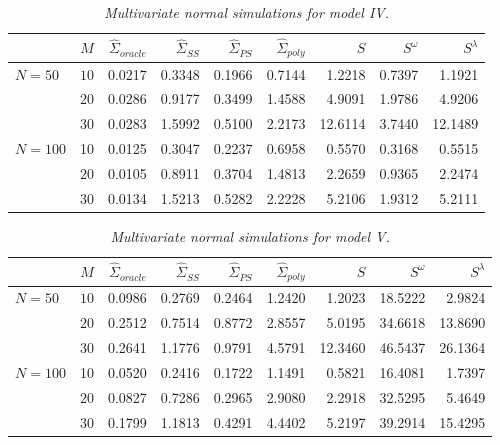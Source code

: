 %
\begin{table}[H]
\centering
\caption{\textit{Multivariate normal simulations for model IV.}}
\begin{tabular}{lrrrrrrrr}
 & $M$ & $\hat{\Sigma}_{oracle}$ & $\hat{\Sigma}_{SS}$& $\hat{\Sigma}_{PS}$ & $\hat{\Sigma}_{poly}$ & $S$ &$S^\omega$& $S^\lambda$ \\ 
  \hline
 $N = 50$ & $10$ & 0.0217 & 0.3348 & 0.1966 & 0.7144 & 1.2218 & 0.7397 & 1.1921 \\ 
   & $20$ &0.0286 & 0.9177 & 0.3499 &  1.4588 & 4.9091 & 1.9786 & 4.9206 \\ 
       & $30$ &  0.0283 &1.5992 & 0.5100 & 2.2173 & 12.6114 & 3.7440 & 12.1489 \\ 
     $N = 100$ & 10 & 0.0125 & 0.3047 & 0.2237 &  0.6958 & 0.5570 & 0.3168 & 0.5515 \\ 
       & $20$ &0.0105 & 0.8911 & 0.3704 &  1.4813 & 2.2659 & 0.9365 & 2.2474 \\ 
       & $30$ & 0.0134 & 1.5213 & 0.5282 & 2.2228 & 5.2106 & 1.9312 & 5.2111 \\ 
   \hline
\end{tabular} 
\label{table:simulation-1-entropy-loss-sigma-4}
\end{table}

%
\begin{table}[H]
\centering
\caption{\textit{Multivariate normal simulations for model V.}}
\begin{tabular}{lrrrrrrrr}
 & $M$ &$\hat{\Sigma}_{oracle}$&$\hat{\Sigma}_{SS}$& $\hat{\Sigma}_{PS}$ & $\hat{\Sigma}_{poly}$ & $S$ &$S^\omega$& $S^\lambda$ \\ 
  \hline
 $N = 50$ & $10$ &  0.0986 &0.2769 & 0.2464 & 1.2420 & 1.2023 & 18.5222 & 2.9824 \\ 
  & $20$ &0.2512 & 0.7514 & 0.8772 &  2.8557 & 5.0195 & 34.6618 & 13.8690 \\ 
  & $30$ &  0.2641& 1.1776 & 0.9791  & 4.5791 & 12.3460 & 46.5437 & 26.1364 \\ 
 $N = 100$ & 10 &0.0520 & 0.2416 & 0.1722 &  1.1491 & 0.5821 & 16.4081 & 1.7397 \\ 
  & $20$ & 0.0827 & 0.7286 & 0.2965 &  2.9080 & 2.2918 & 32.5295 & 5.4649 \\ 
   & $30$ &  0.1799 & 1.1813 & 0.4291 & 4.4402 & 5.2197 & 39.2914 & 15.4295 \\ 
   \hline
\end{tabular}\label{table:simulation-1-entropy-loss-sigma-5}
\end{table}


